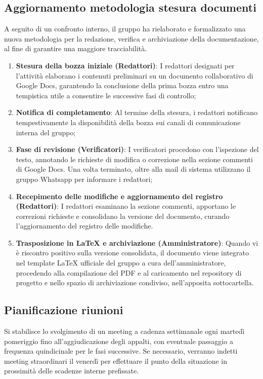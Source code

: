 \subsection{Aggiornamento metodologia stesura documenti}
A seguito di un confronto interno, il gruppo ha rielaborato e formalizzato una nuova metodologia per la redazione, verifica e archiviazione della documentazione, al fine di garantire una maggiore tracciabilità.
\begin{enumerate}
    \item \textbf{Stesura della bozza iniziale (Redattori)}: I redattori designati per l'attività elaborano i contenuti preliminari su un documento collaborativo di Google Docs, garantendo la conclusione della prima bozza entro una tempistica utile a consentire le successive fasi di controllo;
    \item \textbf{Notifica di completamento}: Al termine della stesura, i redattori notificano tempestivamente la disponibilità della bozza sui canali di comunicazione interna del gruppo;
    \item \textbf{Fase di revisione (Verificatori)}: I verificatori procedono con l'ispezione del testo, annotando le richieste di modifica o correzione nella sezione commenti di Google Docs. Una volta terminato, oltre alla mail di sistema utilizzano il gruppo Whatsapp per informare i redattori;
    \item \textbf{Recepimento delle modifiche e aggiornamento del registro (Redattori)}: I redattori esaminano la sezione commenti, apportano le correzioni richieste e consolidano la versione del documento, curando l'aggiornamento del registro delle modifiche.
    \item \textbf{Trasposizione in LaTeX e archiviazione (Amministratore)}: Quando vi è riscontro positivo sulla versione consolidata, il documento viene integrato nel template LaTeX ufficiale del gruppo a cura dell'amministratore, procedendo alla compilazione del PDF e al caricamento nel repository di progetto e nello spazio di archiviazione condiviso, nell'apposita sottocartella.
\end{enumerate}

\subsection{Pianificazione riunioni}
Si stabilisce lo svolgimento di un meeting a cadenza settimanale ogni martedì pomeriggio fino all'aggiudicazione degli appalti, con eventuale passaggio a frequenza quindicinale per le fasi successive. Se necessario, verranno indetti meeting straordinari il venerdì per effettuare il punto della situazione in prossimità delle scadenze interne prefissate.

